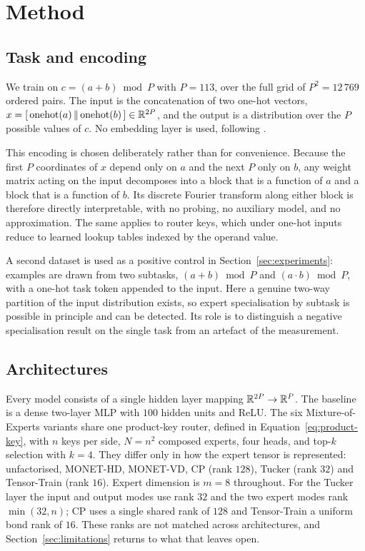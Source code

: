 \section{Method}
\label{sec:method}

\subsection{Task and encoding}

We train on $c = (a+b) \bmod P$ with $P = 113$, over the full grid of $P^2 =
12\,769$ ordered pairs. The input is the concatenation of two one-hot vectors,
$x = [\,\mathrm{onehot}(a) \,\|\, \mathrm{onehot}(b)\,] \in \mathbb{R}^{2P}$, and the
output is a distribution over the $P$ possible values of $c$. No embedding
layer is used, following \citet{bussmann2023modadd}.

This encoding is chosen deliberately rather than for convenience. Because the
first $P$ coordinates of $x$ depend only on $a$ and the next $P$ only on $b$,
any weight matrix acting on the input decomposes into a block that is a
function of $a$ and a block that is a function of $b$. Its discrete Fourier
transform along either block is therefore directly interpretable, with no
probing, no auxiliary model, and no approximation. The same applies to router
keys, which under one-hot inputs reduce to learned lookup tables indexed by
the operand value.

A second dataset is used as a positive control in
Section~\ref{sec:experiments}: examples are drawn from two subtasks,
$(a+b) \bmod P$ and $(a \cdot b) \bmod P$, with a one-hot task token appended
to the input. Here a genuine two-way partition of the input distribution
exists, so expert specialisation by subtask is possible in principle and can
be detected. Its role is to distinguish a negative specialisation result on
the single task from an artefact of the measurement.

\subsection{Architectures}

Every model consists of a single hidden layer mapping $\mathbb{R}^{2P} \to \mathbb{R}^{P}$.
The baseline is a dense two-layer MLP with $100$ hidden units and ReLU. The
six Mixture-of-Experts variants share one product-key router, defined in
Equation~\eqref{eq:product-key}, with $n$ keys per side, $N = n^2$ composed
experts, four heads, and top-$k$ selection with $k = 4$. They differ only in
how the expert tensor is represented: unfactorised, MONET-HD, MONET-VD, CP
(rank $128$), Tucker (rank $32$) and Tensor-Train (rank $16$). Expert dimension is $m = 8$ throughout. For the Tucker layer the input and
output modes use rank $32$ and the two expert modes rank $\min(32, n)$; CP uses
a single shared rank of $128$ and Tensor-Train a uniform bond rank of $16$.
These ranks are not matched across architectures, and
Section~\ref{sec:limitations} returns to what that leaves open.

